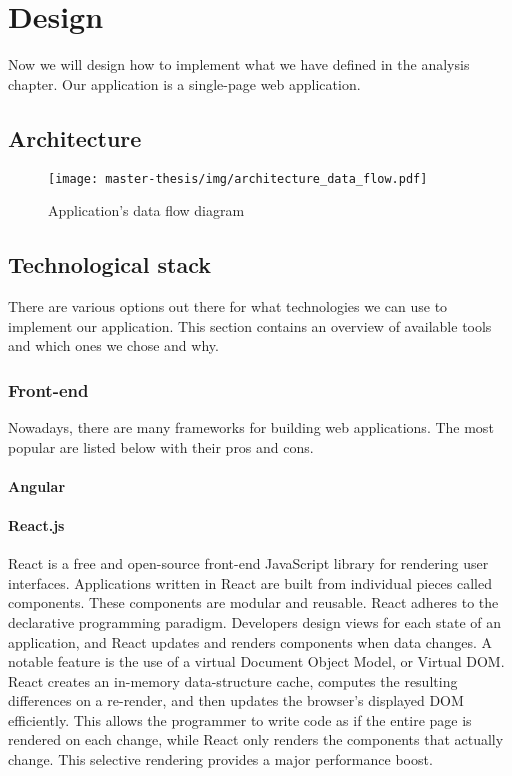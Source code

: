 \chapter{Design}
Now we will design how to implement what we have defined in the analysis chapter.
Our application is a single-page web application.

\section{Architecture}
\begin{figure}[h]
  \centering
  \texttt{[image: master-thesis/img/architecture\_data\_flow.pdf]}
  \caption{Application's data flow diagram}
\end{figure}

\section{Technological stack}
There are various options out there for what technologies we can use to implement our application.
This section contains an overview of available tools and which ones we chose and why.

\subsection{Front-end}
Nowadays, there are many frameworks for building web applications.
The most popular are listed below with their pros and cons.

\subsubsection*{Angular}

\subsubsection*{React.js}
React is a free and open-source front-end JavaScript library for rendering user interfaces.
Applications written in React are built from individual pieces called components.
These components are modular and reusable.
React adheres to the declarative programming paradigm. 
Developers design views for each state of an application, and React updates and renders components when data changes.
A notable feature is the use of a virtual Document Object Model, or Virtual DOM. 
React creates an in-memory data-structure cache, computes the resulting differences on a re-render, and then updates the browser's displayed DOM efficiently. 
This allows the programmer to write code as if the entire page is rendered on each change, while React only renders the components that actually change. 
This selective rendering provides a major performance boost.

